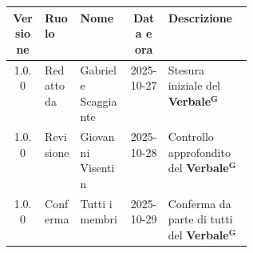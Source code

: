 \documentclass[a4paper,12pt]{article}
\newcommand{\term}[1]{\textbf{#1}$^\mathbf{G}$}
\begin{document}
\begin{center}
\small
\renewcommand{\arraystretch}{1.2} 
\begin{tabular}{|c|l|l|c|>{\raggedright\arraybackslash}p{0.35\linewidth}|}
\hline
\rowcolor{gray!60} 
\textbf{Versione} & \textbf{Ruolo} & \textbf{Nome} & \textbf{Data e ora} & \textbf{Descrizione} \\
\hline
\rowcolor{white}
1.0.0 & Redatto da & Gabriele Scaggiante & 2025-10-27 & Stesura iniziale del \term{Verbale} \\
\hline
\rowcolor{gray!20}
1.0.0 & Revisione & Giovanni Visentin & 2025-10-28 & Controllo approfondito del \term{Verbale} \\
\hline
\rowcolor{white}
1.0.0 & Conferma & Tutti i membri & 2025-10-29 & Conferma da parte di tutti del \term{Verbale} \\
\hline

\end{tabular}
\end{center}


\end{document}
